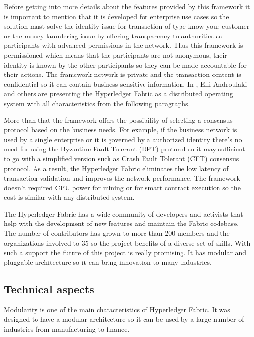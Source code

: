 Before getting into more details about the features provided by this framework it is important to mention that it is developed for enterprise use cases so the solution must solve the identity issue for transaction of type know-your-customer or the money laundering issue by offering transparency to authorities as participants with advanced permissions in the network. Thus this framework is permissioned which means that the participants are not anonymous, their identity is known by the other participants so they can be made accountable for their actions. The framework network is private and the transaction content is confidential so it can contain business sensitive information. In \cite{fabric-article}, Elli Androulaki and others are presenting the Hyperledger Fabric as a distributed operating system with all characteristics from the following paragraphs.

More than that the framework offers the  possibility of selecting a consensus protocol based on the business needs. For example, if the business network is used by a single enterprise or it is governed by a authorized identity there's no need for using the Byzantine Fault Tolerant (BFT) protocol so it may sufficient to go with a simplified version such as Crash Fault Tolerant (CFT) consensus protocol. As a result, the Hyperledger Fabric eliminates the low latency of transaction validation and  improves the network performance. The framework doesn't required CPU power for mining or for smart contract execution so the cost is similar with any distributed system.

The Hyperledger Fabric has a wide community of developers and activists that help with the development of new features and maintain the Fabric codebase. The number of contributors has grown to more than 200 members and the organizations involved to 35 so the project benefits of a diverse set of skills. With such a support the future of this project is really promising. It has modular and pluggable architecture so it can bring innovation to many industries.

\iffalse
\subsection{Technical aspects}
\label{sub-sec:chapter1-subsection2}

Modularity is one of the main characteristics of Hyperledger Fabric. It was
designed to have a modular architecture so it can be used by a large number of industries from manufacturing to finance. 

